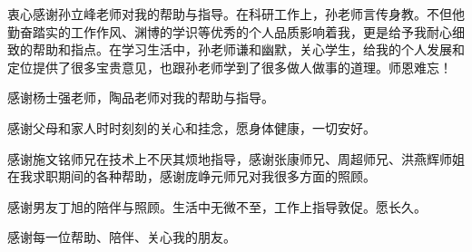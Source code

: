 \begin{ack}

衷心感谢孙立峰老师对我的帮助与指导。在科研工作上，孙老师言传身教。不但他勤奋踏实的工作作风、渊博的学识等优秀的个人品质影响着我，更是给予我耐心细致的帮助和指点。在学习生活中，孙老师谦和幽默，关心学生，给我的个人发展和定位提供了很多宝贵意见，也跟孙老师学到了很多做人做事的道理。师恩难忘！

感谢杨士强老师，陶品老师对我的帮助与指导。

感谢父母和家人时时刻刻的关心和挂念，愿身体健康，一切安好。

感谢施文铭师兄在技术上不厌其烦地指导，感谢张康师兄、周超师兄、洪燕辉师姐在我求职期间的各种帮助，感谢庞峥元师兄对我很多方面的照顾。

感谢男友丁旭的陪伴与照顾。生活中无微不至，工作上指导敦促。愿长久。

感谢每一位帮助、陪伴、关心我的朋友。

\end{ack}





